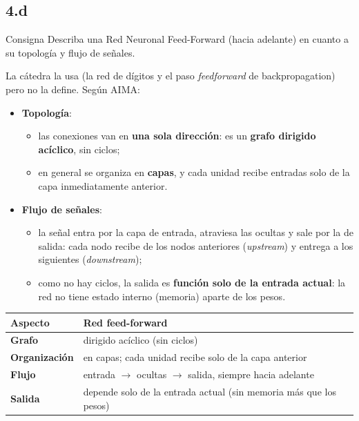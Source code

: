\documentclass[11pt,a4paper]{article}
\begin{document}
\subsection{4.d}

\begin{enunciado}{Consigna}
Describa una Red Neuronal Feed-Forward (hacia adelante) en cuanto a su topología y flujo de señales.
\end{enunciado}

La cátedra la usa (la red de dígitos y el paso \textit{feedforward} de backpropagation) pero no la define. Según AIMA:
\begin{itemize}
  \item \textbf{Topología}:
  \begin{itemize}
    \item las conexiones van en \textbf{una sola dirección}: es un \textbf{grafo dirigido acíclico}, sin ciclos;
    \item en general se organiza en \textbf{capas}, y cada unidad recibe entradas solo de la capa inmediatamente anterior.
  \end{itemize}
  \item \textbf{Flujo de señales}:
  \begin{itemize}
    \item la señal entra por la capa de entrada, atraviesa las ocultas y sale por la de salida: cada nodo recibe de los nodos anteriores (\textit{upstream}) y entrega a los siguientes (\textit{downstream});
    \item como no hay ciclos, la salida es \textbf{función solo de la entrada actual}: la red no tiene estado interno (memoria) aparte de los pesos.
  \end{itemize}
\end{itemize}

\begin{center}
\small
\begin{tabularx}{\linewidth}{@{}>{\bfseries}l X@{}}
\toprule
Aspecto & \textbf{Red feed-forward} \\
\midrule
Grafo & dirigido acíclico (sin ciclos) \\
Organización & en capas; cada unidad recibe solo de la capa anterior \\
Flujo & entrada $\to$ ocultas $\to$ salida, siempre hacia adelante \\
Salida & depende solo de la entrada actual (sin memoria más que los pesos) \\
\bottomrule
\end{tabularx}
\end{center}
\end{document}
